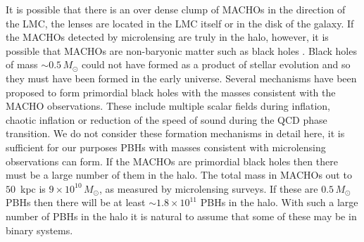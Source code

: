 It is possible that there is an over dense clump of MACHOs in the direction of
the LMC\cite{1996ApJ...473L..99N}, the lenses are located in the LMC
itself\cite{Salati:1999gd} or in the disk of the galaxy\cite{Evans:1997hq}. 
If the MACHOs detected by microlensing are truly in the halo, however, it is
possible that MACHOs are non-baryonic matter such as black holes
\cite{Finn:1996dd,Nakamura:1997sm}. Black holes of mass $\sim 0.5\,M_\odot$
could not have formed as a product of stellar evolution and so they must have
been formed in the early universe\cite{1967SvA....10..602Z,1974MNRAS.168..399C}.
Several mechanisms have been proposed to form primordial black holes with the
masses consistent with the MACHO observations. These include multiple scalar
fields during inflation\cite{Yokoyama:1995ex}, chaotic 
inflation\cite{Yokoyama:1999xi} or reduction of the speed of sound during the
QCD phase transition\cite{Jedamzik:1996mr}. We do not consider these formation
mechanisms in detail here, it is sufficient for our purposes PBHs with masses
consistent with microlensing observations can form.  If the MACHOs are
primordial black holes then there must be a large number of them in the halo. 
The total mass in MACHOs out to $50$~kpc is $9\times 10^{10}\,M_\odot$, as
measured by microlensing surveys. If these are $0.5\,M_\odot$ PBHs then there
will be at least $\sim 1.8 \times 10^{11}$ PBHs in the halo. With such a large
number of PBHs in the halo it is natural to assume that some of these may be
in binary systems.


